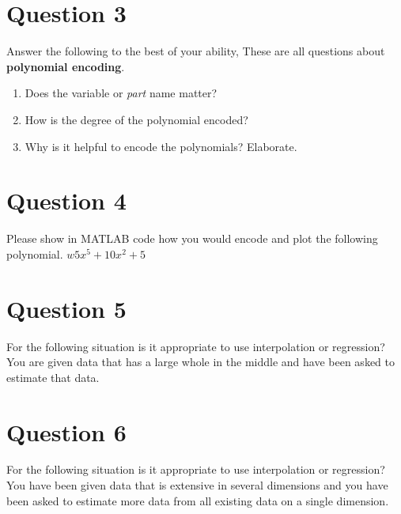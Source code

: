 \documentclass[12pt]{article}
\begin{document}
	\section*{Question 3}
		Answer the following to the best of your ability,
			These are all questions about \textbf{polynomial encoding}.
		\begin{enumerate}
			\item Does the variable or \textit{part} name matter?
			\item How is the degree of the polynomial encoded?
			\item Why is it helpful to encode the polynomials? Elaborate.
		\end{enumerate}

	\section*{Question 4}
		Please show in MATLAB code how you would encode and plot the following polynomial.
		$w5x^5 + 10x^2 + 5$
	
	\section*{Question 5}
		For the following situation is it appropriate to use interpolation or regression? \\

		\indent You are given data that has a large whole in the middle and have been asked to estimate that data.

	\section*{Question 6}
		For the following situation is it appropriate to use interpolation or regression? \\

		\indent You have been given data that is extensive in several dimensions and you have been asked to estimate more data from all existing data on a single dimension.


	\nocite{*}

	\newpage %
	\backmatter
	\printbibliography

	\newpage %
	\printindex

	\newpage %
	\appendix
\end{document}
